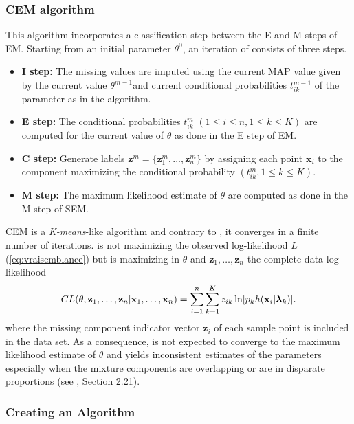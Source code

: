 \documentclass[shortnames,nojss,article]{jss}
\newcommand{\bx}{\mathbf{x}}
\newcommand{\bz}{\mathbf{z}}
\newcommand{\blambda}{\boldsymbol{\lambda}}
\begin{document}
\subsubsection{CEM algorithm}
This algorithm incorporates a classification step between the E and M steps of EM. Starting
from an initial parameter $\theta^0$, an iteration of  consists of three steps.
\begin{itemize}
\item {\bf I step:} The missing values are imputed using the current MAP
value given by the current value $\theta^{m-1}$and current conditional
probabilities $t^{m-1}_{ik}$ of the parameter as in the  algorithm.

\item {\bf E step:} The conditional probabilities $t^m_{ik}$ $(1\leq i \leq n,
1 \leq k \leq K)$ are computed for the current value of $\theta$ as done in the
E step of EM.

\item {\bf C step:} Generate labels ${\bz}^m=\{ {\bz}^m_1,...,{\bz}^m_n\}$ by
assigning each point ${\bx}_i$ to the component maximizing the conditional
probability $(t^m_{ik}, 1 \leq k \leq K)$.

\item {\bf M step:} The maximum likelihood estimate of $\theta$ are computed as
done in the M step of SEM.
\end{itemize}

CEM is a {\em K-means}-like algorithm and contrary to , it converges in
a finite number of iterations.  is not maximizing the observed
log-likelihood $L$ (\ref{eq:vraisemblance}) but is maximizing in
$\theta$ and $\bz_{1},\ldots,\bz_{n}$ the complete data log-likelihood
\begin{equation} \label{cl}
  CL(\theta, {\bf z}_{1},\ldots,{\bf z}_{n}|{\bf
    x}_{1},\ldots,{\bf x}_{n}) = \sum_{i=1}^n\sum_{k=1}^{K}
  z_{ik}\ln[p_{k} h({\bf x}_i|\blambda_k)].
\end{equation}
where the missing component indicator vector $\bz_i$ of each sample point is
included in the data set. As a consequence,  is not expected to
converge to the maximum likelihood estimate of $\theta$ and yields inconsistent
estimates of the parameters especially when the mixture components are
overlapping or are in disparate proportions (see \cite{McLachlanPeel00},
Section 2.21).

\subsubsection{Creating an Algorithm}\label{subsec:CretingAlgo}
\end{document}
